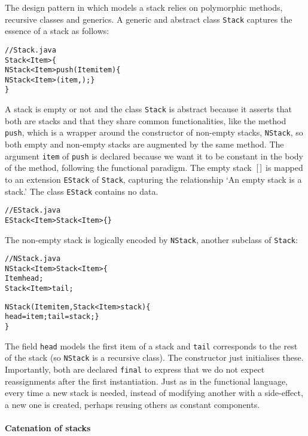 The design pattern in \Java which models a stack  relies on polymorphic methods, recursive classes and
generics. A generic and abstract class \texttt{Stack} captures the
essence of a stack as follows:
\begin{alltt}
// Stack.java
\public \abstractX \class Stack<Item> \{
  \public \final NStack<Item> push(\final Item item) \{
    \return \new NStack<Item>(item,\this); \}
\}
\end{alltt}
A stack is empty or not and the class \texttt{Stack} is abstract
because it asserts that both are stacks and that they share common
functionalities, like the method \texttt{push}, which is a wrapper
around the constructor of non\hyp{}empty stacks, \texttt{NStack}, so
both empty and non\hyp{}empty stacks are augmented by the same
method. The argument \texttt{item} of \texttt{push} is declared
\final{} because we want it to be constant in the body of the method,
following the functional paradigm. The empty stack~\([\,]\) is mapped
to an extension \texttt{EStack} of \texttt{Stack}, capturing the
relationship `An empty stack is a stack.' The class \texttt{EStack}
contains no data.
\begin{alltt}
// EStack.java
\public \final \class EStack<Item> \extends Stack<Item> \{\}
\end{alltt}
The non\hyp{}empty stack is logically encoded by \texttt{NStack},
another subclass of \texttt{Stack}:
\begin{alltt}
// NStack.java
\public \final \class NStack<Item> \extends Stack<Item> \{
  \private \final Item head;
  \private \final Stack<Item> tail;

  \public NStack(\final Item item, \final Stack<Item> stack) \{
    head = item; tail = stack; \}
\}
\end{alltt}
The field \texttt{head} models the first item of a stack and
\texttt{tail} corresponds to the rest of the stack (so \texttt{NStack}
is a recursive class). The constructor just initialises
these. Importantly, both are declared \texttt{final} to express that
we do not expect reassignments after the first instantiation. Just as
in the functional language, every time a new stack is needed, instead
of modifying another with a side\hyp{}effect, a new one is created,
perhaps reusing others as constant components.

\paragraph{Catenation of stacks}

